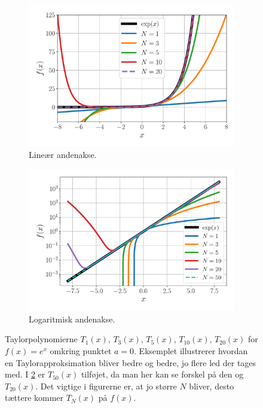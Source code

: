 \begin{figure}[]
	\centering
	\begin{subfigure}[t]{.475\textwidth}
	    \centering
    	\includegraphics[width=\columnwidth]{Matematik/matfig/taylor.pdf}
    	\caption{Lineær andenakse.}
    	\label{mat:eq:taylor_lin}
    \end{subfigure}
    \hfill
	\begin{subfigure}[t]{.475\textwidth}
	    \centering
    	\includegraphics[width=\columnwidth]{Matematik/matfig/taylor_log.pdf}
    	\caption{Logaritmisk andenakse.}
    	\label{mat:eq:taylor_log}
    \end{subfigure}
	\caption{Taylorpolynomierne $T_1(x), \, T_3(x), \, T_5(x), \,T_{10}(x), \, T_{20}(x)$ for $f(x) = e^x$ omkring punktet $a=0$. Eksemplet illustrerer hvordan en Taylorapproksimation bliver bedre og bedre, jo flere led der tages med. I \cref{mat:eq:taylor_log} er $T_{50}(x)$ tilføjet, da man her kan se forskel på den og $T_{20}(x)$. Det vigtige i figurerne er, at jo større $N$ bliver, desto tættere kommer $T_N(x)$ på $f(x)$.}
	\label{mat:fig:Taylorseries_figure}
\end{figure}

